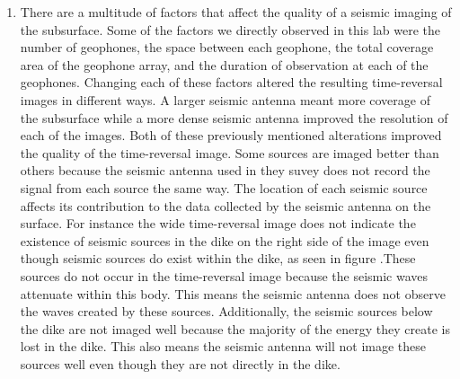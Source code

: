 \begin{enumerate}
\item There are a multitude of factors that affect the quality of a seismic imaging of the subsurface. Some of the factors we directly observed in this lab were the number of geophones, the space between each geophone, the total coverage area of the geophone array, and the duration of observation at each of the geophones. Changing each of these factors altered the resulting time-reversal images in different ways. A larger seismic antenna meant more coverage of the subsurface while a more dense seismic antenna improved the resolution of each of the images. Both of these previously mentioned alterations improved the quality of the time-reversal image. Some sources are imaged better than others because the seismic antenna used in they suvey does not record the signal from each source the same way. The location of each seismic source affects its contribution to the data collected by the seismic antenna on the surface. For instance the wide time-reversal image  does not indicate the existence of seismic sources in the dike on the right side of the image even though seismic sources do exist within the dike, as seen in figure .These sources do not occur in the time-reversal image because the seismic waves attenuate within this body. This means the seismic antenna does not observe the waves created by these sources. Additionally, the seismic sources below the dike are not imaged well because the majority of the energy they create is lost in the dike. This also means the seismic antenna will not image these sources well even though they are not directly in the dike. 
\end{enumerate}